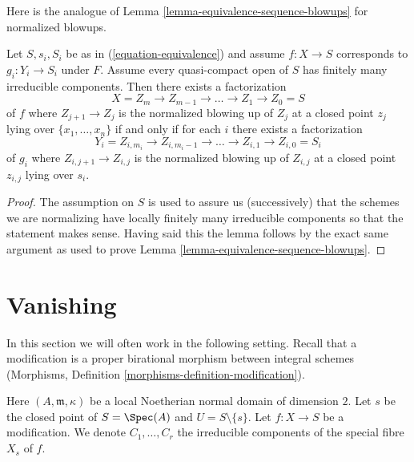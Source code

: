 \noindent
Here is the analogue of
Lemma \ref{lemma-equivalence-sequence-blowups}
for normalized blowups.

\begin{lemma}
\label{lemma-equivalence-sequence-normalized-blowups}
Let $S, s_i, S_i$ be as in (\ref{equation-equivalence})
and assume $f : X \to S$ corresponds to $g_i : Y_i \to S_i$ under $F$.
Assume every quasi-compact open of $S$ has finitely many irreducible
components.  Then there exists a factorization
$$
X = Z_m \to Z_{m - 1} \to \ldots \to Z_1 \to Z_0 = S
$$
of $f$ where $Z_{j + 1} \to Z_j$ is the normalized blowing up of $Z_j$
at a closed point $z_j$ lying over $\{x_1, \ldots, x_n\}$ if and only if
for each $i$ there exists a factorization
$$
Y_i = Z_{i, m_i} \to Z_{i, m_i - 1} \to \ldots \to Z_{i, 1} \to Z_{i, 0} = S_i
$$
of $g_i$ where $Z_{i, j + 1} \to Z_{i, j}$ is the normalized blowing up of
$Z_{i, j}$ at a closed point $z_{i, j}$ lying over $s_i$.
\end{lemma}

\begin{proof}
The assumption on $S$ is used to assure us (successively) that
the schemes we are normalizing have locally finitely many irreducible
components so that the statement makes sense. Having said this the
lemma follows by the exact same argument as used to prove
Lemma \ref{lemma-equivalence-sequence-blowups}.
\end{proof}








\section{Vanishing}
\label{section-vanishing}

\noindent
In this section we will often work in the following setting.
Recall that a modification is a proper birational morphism
between integral schemes (Morphisms, Definition
\ref{morphisms-definition-modification}).

\begin{situation}
\label{situation-vanishing}
Here $(A, \mathfrak m, \kappa)$ be a local Noetherian normal domain of
dimension $2$. Let $s$ be the closed point of $S = \Spec(A)$ and
$U = S \setminus \{s\}$. Let $f : X \to S$ be a modification.
We denote $C_1, \ldots, C_r$ the irreducible
components of the special fibre $X_s$ of $f$.
\end{situation}

